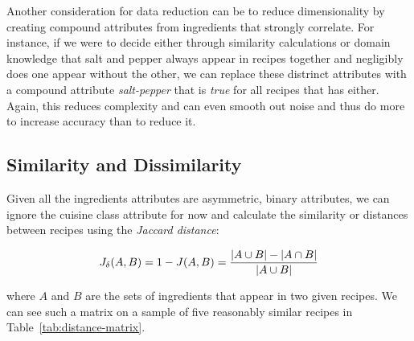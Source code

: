 \documentclass[11pt,a4paper]{article}
\begin{document}
Another consideration for data reduction can be to reduce dimensionality by creating
compound attributes from ingredients that strongly correlate. For instance, if
we were to decide either through similarity calculations or domain knowledge
that salt and pepper always appear in recipes together and negligibly does
one appear without the other, we can replace these distrinct attributes with a compound
attribute \emph{salt-pepper} that is \emph{true} for all recipes that has either.
Again, this reduces complexity and can even smooth out noise \cite{han2006data} and
thus do more to increase accuracy than to reduce it.

\subsection{Similarity and Dissimilarity}

Given all the ingredients attributes are asymmetric, binary attributes, we can ignore
the cuisine class attribute for now and calculate the similarity or distances
between recipes using the \emph{Jaccard distance}: \cite{han2006data}

\begin{equation}
J_{\delta}(A,B) = 1 - J(A,B) = { { |A \cup B| - |A \cap B| } \over |A \cup B| }
\end{equation}

\noindent where $A$ and $B$ are the sets of ingredients that appear in two given
recipes. We can see such a matrix on a sample of five reasonably similar recipes
in Table~\ref{tab:distance-matrix}.

\end{document}
